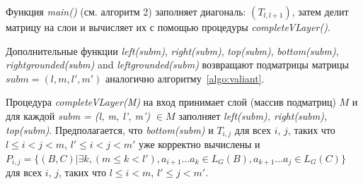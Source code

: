 Функция \textit{main()} (см. алгоритм 2) заполняет диагональ:  $(T_{l, l+1})$, затем делит матрицу на слои и вычисляет их с помощью процедуры \textit{completeVLayer()}.

Дополнительные функции \textit{left(subm)}, \textit{right(subm)}, \textit{top(subm)}, \textit{bottom(subm)}, \textit{rightgrounded(subm)} and \textit{leftgrounded(subm)} возвращают подматрицы матрицы $\textit{subm} = (l, m, l', m')$ аналогично алгоритму~\ref{algo:valiant}.

Процедура \textit{completeVLayer(M)} на вход принимает слой (массив подматриц)  $M$ и для каждой \textit{subm = (l, m, l', m') $\in M$} заполняет \textit{left(subm), right(subm), top(subm)}.
Предполагается, что \textit{bottom(subm)} и $T_{i, j}$ для всех $i$, $j$, таких что $l \leq i < j < m$, $  l' \leq i < j < m'$ уже корректно вычислены и
$P_{i, j} =  \{ (B, C) | \exists k, (m \le k < l'), a_{i + 1} \dots a_{k} \in L_G(B), a_{k + 1} \dots a_{j} \in L_G(C)\} $ для всех $i$, $j$, таких что $l \leq i < m$, $l' \leq j < m'$.


